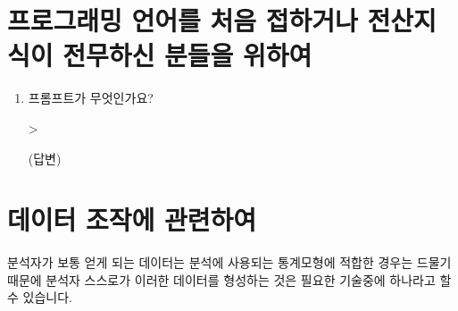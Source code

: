 \documentclass{article}
\begin{document}
%
%
%

\section{프로그래밍 언어를 처음 접하거나 전산지식이 전무하신 분들을 위하여}

\begin{enumerate}
	\item 프롬프트가 무엇인가요? 
	\begin{Schunk}
	\begin{Soutput}
	>
	\end{Soutput}
	\end{Schunk}
	
	\textsf{(답변)} 

\end{enumerate}



%
%
%

\section{데이터 조작에 관련하여}

분석자가 보통 얻게 되는 데이터는 분석에 사용되는 통계모형에 적합한 경우는 드물기 때문에 분석자 스스로가 이러한 데이터를 형성하는 것은 필요한 기술중에 하나라고 할 수 있습니다.
% 
\end{document}
